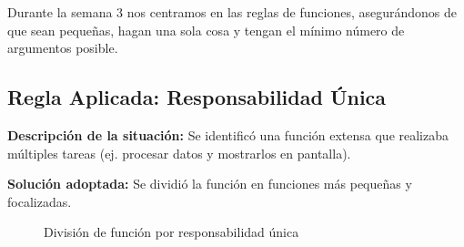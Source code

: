 Durante la semana 3 nos centramos en las reglas de funciones, asegurándonos de que sean pequeñas, hagan una sola cosa y tengan el mínimo número de argumentos posible.

\subsection{Regla Aplicada: Responsabilidad Única}
\textbf{Descripción de la situación:}
Se identificó una función extensa que realizaba múltiples tareas (ej. procesar datos y mostrarlos en pantalla).

\textbf{Solución adoptada:}
Se dividió la función en funciones más pequeñas y focalizadas.

\begin{figure}[h]
    \centering
    \caption{División de función por responsabilidad única}
    \label{fig:semana3_ejemplo1}
\end{figure}
